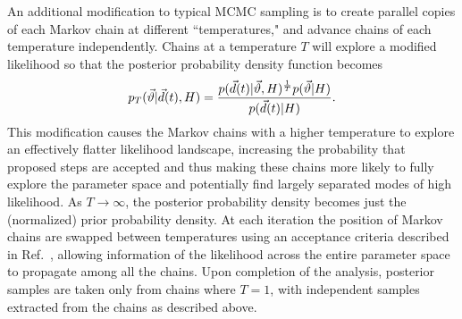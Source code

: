 An additional modification to typical MCMC sampling is to create parallel copies of each Markov chain at different ``temperatures," and advance chains of each temperature independently. Chains at a temperature $T$ will explore a modified likelihood so that the posterior probability density function becomes
\begin{equation}
p_{T}(\vec{\vartheta}|\vec{d}(t),H) = \frac{ p(\vec{d}(t)|\vec{\vartheta},H)^{\frac{1}{T}} p(\vec{\vartheta}|H) }{p(\vec{d}(t)|H)} .
\end{equation}
This modification causes the Markov chains with a higher temperature to explore an effectively flatter likelihood landscape, increasing the probability that proposed steps are accepted and thus making these chains more likely to fully explore the parameter space and potentially find largely separated modes of high likelihood. As $T \to \infty$, the posterior probability density becomes just the (normalized) prior probability density. At each iteration the position of Markov chains are swapped between temperatures using an acceptance criteria described in Ref.~\cite{vousden:2016}, allowing information of the likelihood across the entire parameter space to propagate among all the chains. Upon completion of the analysis, posterior samples are taken only from chains where $T=1$, with independent samples extracted from the chains as described above.

